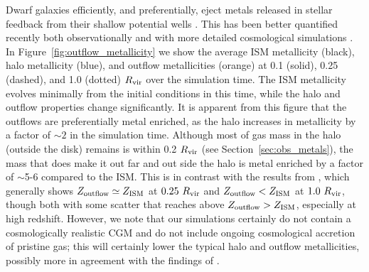 \documentclass[twocolumn]{aastex61}
\begin{document}
Dwarf galaxies efficiently, and preferentially, eject metals released in stellar feedback from their shallow potential wells \citep{MacLowFerrara1999,FerraraTolstoy2000}. This has been better quantified recently both observationally \citep[e.g.][]{Zahid2012,Peeples2014,McQuinn2015} and with more detailed cosmological simulations \citep{Angles-Alcazar2017,Muratov2017}. In Figure~\ref{fig:outflow_metallicity} we show the average ISM metallicity (black), halo metallicity (blue), and outflow metallicities (orange) at 0.1 (solid), 0.25 (dashed), and 1.0 (dotted) $R_{\rm vir}$ over the simulation time. The ISM metallicity evolves minimally from the initial conditions in this time, while the halo and outflow properties change significantly. It is apparent from this figure that the outflows are preferentially metal enriched, as the halo increases in metallicity by a factor of $\sim 2$ in the simulation time. Although most of gas mass in the halo (outside the disk) remains is within 0.2 $R_{\rm vir}$ (see Section~\ref{sec:obs_metals}), the mass that does make it out far and out side the halo is metal enriched by a factor of $\sim$5-6 compared to the ISM. This is in contrast with the results from \citet{Muratov2017}, which generally shows $Z_{\rm outflow} \simeq Z_{\rm ISM}$ at $0.25~R_{\rm vir}$ and $Z_{\rm outflow} < Z_{\rm ISM}$ at $1.0~R_{\rm vir}$, though both with some scatter that reaches above $Z_{\rm outflow} > Z_{\rm ISM}$, especially at high redshift. However, we note that our simulations certainly do not contain a cosmologically realistic CGM and do not include ongoing cosmological accretion of pristine gas; this will certainly lower the typical halo and outflow metallicities, possibly more in agreement with the findings of \citet{Muratov2017}.
\end{document}
